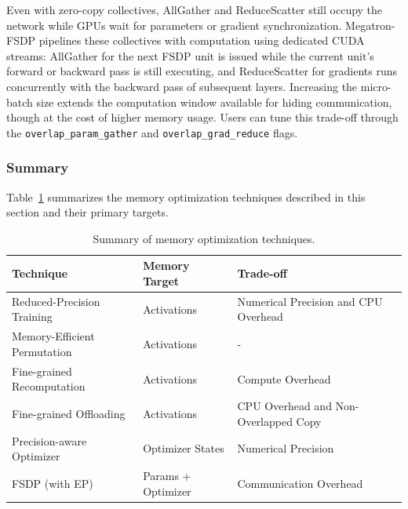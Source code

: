 Even with zero-copy collectives, AllGather and ReduceScatter still occupy the network while GPUs wait for parameters or gradient synchronization. Megatron-FSDP pipelines these collectives with computation using dedicated CUDA streams: AllGather for the next FSDP unit is issued while the current unit's forward or backward pass is still executing, and ReduceScatter for gradients runs concurrently with the backward pass of subsequent layers. Increasing the micro-batch size extends the computation window available for hiding communication, though at the cost of higher memory usage. Users can tune this trade-off through the \texttt{overlap\_param\_gather} and \texttt{overlap\_grad\_reduce} flags.



\subsubsection{Summary}
Table~\ref{tab:memory-opt-summary} summarizes the memory optimization techniques described in this section and their primary targets.

\begin{table}[ht]
\centering
\caption{Summary of memory optimization techniques.}
\label{tab:memory-opt-summary}
\begin{tabular}{lll}
\toprule
\textbf{Technique} & \textbf{Memory Target} & \textbf{Trade-off} \\
\midrule
Reduced-Precision Training & Activations & Numerical Precision and CPU Overhead \\
Memory-Efficient Permutation & Activations & - \\
Fine-grained Recomputation & Activations & Compute Overhead \\
Fine-grained Offloading & Activations & CPU Overhead and Non-Overlapped Copy \\
Precision-aware Optimizer & Optimizer States & Numerical Precision \\
FSDP (with EP) & Params + Optimizer & Communication Overhead \\
\bottomrule
\end{tabular}
\end{table}


